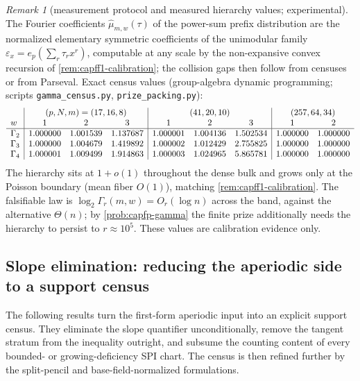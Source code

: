 \documentclass[11pt]{article}
\theoremstyle{definition}
\theoremstyle{remark}
\newtheorem{remark}[remark]{Remark}
\begin{document}
\begin{remark}[measurement protocol and measured hierarchy values; experimental]\label{rem:capfp-gamma-measured}
The Fourier coefficients $\widehat\mu_{m,w}(\tau)$ of the power-sum prefix distribution are the normalized elementary symmetric coefficients of the unimodular family $\varepsilon_x=e_p(\sum_r\tau_rx^r)$, computable at any scale by the non-expansive convex recursion of \cref{rem:capff1-calibration}; the collision gaps then follow from censuses or from Parseval.  Exact census values \textup(group-algebra dynamic programming; scripts \texttt{gamma\_census.py}, \texttt{prize\_packing.py}\textup):
\[
\begin{array}{l|ccc|ccc|cc}
 & \multicolumn{3}{c|}{(p,N,m)=(17,16,8)} & \multicolumn{3}{c|}{(41,20,10)} & \multicolumn{2}{c}{(257,64,34)}\\
w & 1 & 2 & 3 & 1 & 2 & 3 & 1 & 2\\ \hline
\Gamma_2 & 1.000000 & 1.001539 & 1.137687 & 1.000001 & 1.004136 & 1.502534 & 1.000000 & 1.000000\\
\Gamma_3 & 1.000000 & 1.004679 & 1.419892 & 1.000002 & 1.012429 & 2.755825 & 1.000000 & 1.000000\\
\Gamma_4 & 1.000001 & 1.009499 & 1.914863 & 1.000003 & 1.024965 & 5.865781 & 1.000000 & 1.000000\\
\end{array}
\]
The hierarchy sits at $1+o(1)$ throughout the dense bulk and grows only at the Poisson boundary \textup(mean fiber $O(1)$\textup), matching \cref{rem:capff1-calibration}.  The falsifiable law is $\log_2\Gamma_r(m,w)=O_r(\log n)$ across the band, against the alternative $\Theta(n)$; by \cref{prob:capfp-gamma} the finite prize additionally needs the hierarchy to persist to $r\approx10^5$.  These values are calibration evidence only.
\end{remark}

\subsection{Slope elimination: reducing the aperiodic side to a support census}

The following results turn the first-form aperiodic input into an explicit support census.  They eliminate the slope quantifier unconditionally, remove the tangent stratum from the inequality outright, and subsume the counting content of every bounded- or growing-deficiency SPI chart.  The census is then refined further by the split-pencil and base-field-normalized formulations.
\end{document}
